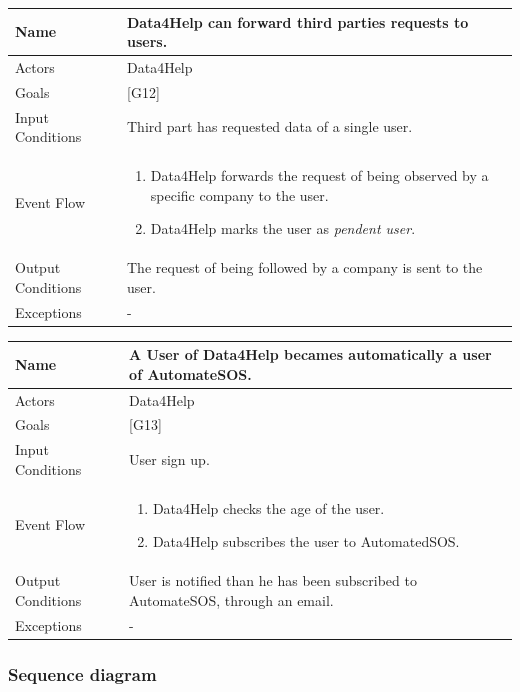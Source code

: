\documentclass{article}
\begin{document}
\begin{center}
    \begin{tabular}{ | l | p{10cm} |}
    \hline
    Name & Data4Help can forward third parties requests to users. \\ \hline
    Actors & Data4Help\\ \hline
   	Goals & {[G12]}\\ \hline
    Input Conditions & Third part has requested data of a single user.\\ \hline
    Event Flow & \begin{enumerate}
    	\item Data4Help forwards the request of being observed by a specific company to the user.
    	\item Data4Help marks the user as \emph{pendent user}.
    \end{enumerate} \\ \hline
    Output Conditions & The request of being followed by a company is sent to the user. \\ \hline
    Exceptions & -    \\ \hline
    \end{tabular}
\end{center}


\begin{center}
    \begin{tabular}{ | l | p{10cm} |}
    \hline
    Name & A User of Data4Help becames automatically a user of AutomateSOS. \\ \hline
    Actors & Data4Help\\ \hline
   	Goals & {[G13]}\\ \hline
    Input Conditions & User sign up.\\ \hline
    Event Flow & \begin{enumerate}
    	\item Data4Help checks the age of the user.
    	\item Data4Help subscribes the user to AutomatedSOS.
    \end{enumerate} \\ \hline
    Output Conditions & User is notified than he has been subscribed to AutomateSOS, through an email. \\ \hline
    Exceptions & -  \\ \hline
    \end{tabular}
\end{center}\newpage

\subsubsection{Sequence diagram}
\end{document}
